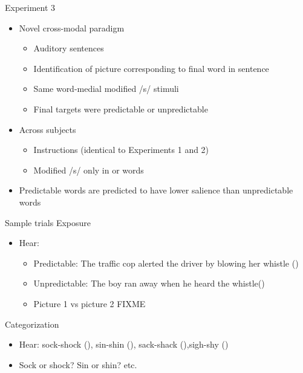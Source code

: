 \documentclass{beamer}
\begin{document}
\begin{frame}{Experiment 3}

\begin{itemize}
\item Novel cross-modal paradigm
\begin{itemize}
\item Auditory sentences
\item Identification of picture corresponding to final word in sentence
\item Same word-medial modified /s/ stimuli
\item Final targets were predictable or unpredictable
\end{itemize}
\item Across subjects
\begin{itemize}
\item Instructions (identical to Experiments 1 and 2)
\item Modified /s/ only in  or  words
\end{itemize}
\item Predictable words are predicted to have lower salience than unpredictable words
\end{itemize}

\end{frame}

\begin{frame}{Sample trials}
Exposure
\begin{itemize}
\item Hear: 
\begin{itemize}
\item Predictable: The traffic cop alerted the driver by blowing her whistle () 
\item Unpredictable: The boy ran away when he heard the whistle()
\item Picture 1 vs picture 2 FIXME
\end{itemize}
\end{itemize}
Categorization
\begin{itemize}
\item Hear: sock-shock (), sin-shin (), sack-shack (),sigh-shy ()
\item Sock or shock? Sin or shin? etc.
\end{itemize}

\end{frame}
\end{document}

